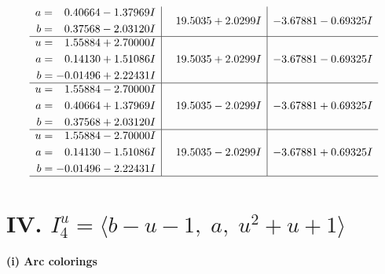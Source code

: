 \documentclass[1p]{elsarticle_modified}
\theoremstyle{definition}
\begin{document}
$$\begin{array}{c|c|c}
\begin{aligned}
a &= \phantom{-}0.40664 - 1.37969 I \\
b &= \phantom{-}0.37568 - 2.03120 I\end{aligned}
 & \phantom{-}19.5035 + 2.0299 I & -3.67881 - 0.69325 I \\ \hline\begin{aligned}
u &= \phantom{-}1.55884 + 2.70000 I \\
a &= \phantom{-}0.14130 + 1.51086 I \\
b &= -0.01496 + 2.22431 I\end{aligned}
 & \phantom{-}19.5035 + 2.0299 I & -3.67881 - 0.69325 I \\ \hline\begin{aligned}
u &= \phantom{-}1.55884 - 2.70000 I \\
a &= \phantom{-}0.40664 + 1.37969 I \\
b &= \phantom{-}0.37568 + 2.03120 I\end{aligned}
 & \phantom{-}19.5035 - 2.0299 I & -3.67881 + 0.69325 I \\ \hline\begin{aligned}
u &= \phantom{-}1.55884 - 2.70000 I \\
a &= \phantom{-}0.14130 - 1.51086 I \\
b &= -0.01496 - 2.22431 I\end{aligned}
 & \phantom{-}19.5035 - 2.0299 I & -3.67881 + 0.69325 I\\
 \hline 
 \end{array}$$\newpage\newpage\renewcommand{\arraystretch}{1}
\centering \section*{IV. $I^u_{4}= \langle b- u-1,\;a,\;u^2+u+1 \rangle$}
\flushleft \textbf{(i) Arc colorings}\\
\end{document}
